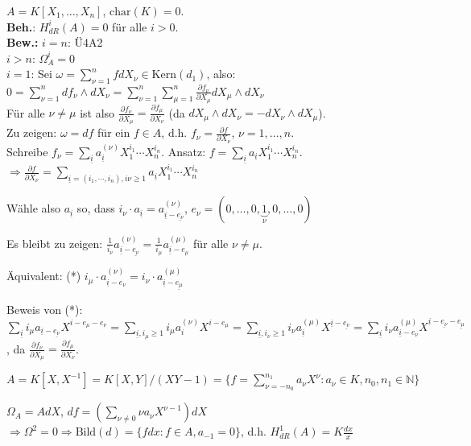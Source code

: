 \begin{nnBsp}
$A=K[X_1, \ldots, X_n]$, $\textrm{char}(K)=0$.\\
\textbf{Beh.}: $H_{dR}^i(A) = 0$ f\"ur alle $i>0$.\\
\textbf{Bew.: } $i=n$: \"U4A2\\
$i>n$: $\Omega_A^i=0$\\
$i=1$: Sei $\omega=\sum_{\nu=1}^nf dX_\nu\in \textrm{Kern}(d_1)$, also:
$0=\sum_{\nu=1}^n df_\nu \wedge dX_\nu=\sum_{\nu=1}^n\sum_{\mu=1}^n\frac{\partial f_\nu}{\partial X_\mu}dX_\mu\wedge dX_\nu$\\
F\"ur alle $\nu\neq \mu$ ist also $\frac{\partial f_\nu}{\partial X_\mu}=\frac{\partial f_\mu}{\partial X_\nu}$ 
(da $dX_\mu\wedge dX_\nu = -dX_\nu\wedge dX_\mu$).\\
Zu zeigen: $\omega = df$ f\"ur ein $f\in A$, d.h. $f_\nu=\frac{\partial f}{\partial X_\nu}$, $\nu=1, \ldots, n$.\\
Schreibe $f_\nu=\sum_{\underline{i}} a_{\underline{i}}^{(\nu)}X_1^{i_1}\cdots X_n^{i_n}$. 
Ansatz: $f=\sum_{\underline{i}} a_{\underline{i}} X_1^{i_1}\cdots X_n^{i_n}$.
$\Rightarrow \frac{\partial f}{\partial X_\nu}
=\sum_{\underline{i}=(i_1, \cdots, i_n), i\nu\geq 1}a_{\underline{i}} X_1^{i_1}\cdots X_n^{i_n}$

W\"ahle also $a_{\underline{i}}$ so, dass $i_\nu\cdot a_{\underline{i}} = a_{\underline{i}-\underline{e_\nu}}^{(\nu)}$, 
$e_\nu=(0,\ldots,0,\underbrace{1}_{\nu},0,\ldots, 0)$

Es bleibt zu zeigen: $\frac{1}{i_\nu} a_{\underline{i}-\underline{e_\nu}}^{(\nu)}
=\frac{1}{i_\mu} a_{\underline{i}-e_\mu}^{(\mu)}$ f\"ur alle $\nu\neq \mu$.

\"Aquivalent: (*) $i_\mu\cdot a_{\underline{i}-e_{\nu}}^{(\nu)}=i_\nu \cdot a_{\underline{i}-\underline{e_\mu}}^{(\mu)}$

Beweis von (*): $
\sum_{\underline{i}} i_\mu a_{\underline{i}-\underline{e_\nu}}X^{i-e_\mu-e_\nu}
= \sum_{\underline{i}, i_\mu\geq 1} i_\mu a_{i}^{(\nu)} X^{i-e_\mu}
= \sum_{\underline{i}, i_\nu\geq 1}i_\nu a_{\underline{i}}^{(\mu)}X^{\underline{i}-\underline{e_\nu}}
= \sum_{\underline{i}} i_\nu a_{\underline{i}-e_\nu}^{(\mu)}X^{\underline{i}-\underline{e_\nu}-\underline{e_\mu}}$, 
da $\frac{\partial f_\nu}{\partial X_\mu} = \frac{\partial f_\mu}{\partial X_\nu}$.
\end{nnBsp}

\begin{nnBsp}
$A=K[X, X^{-1}]=K[X,Y]/(XY-1)=\{f=\sum_{\nu=-n_0}^{n_1} a_\nu X^\nu: a_\nu\in K, n_0, n_1\in \mathbb{N}\}$

$\Omega_A=AdX$, $df=(\sum_{\nu\neq 0}\nu a_\nu X^{\nu-1})dX$
$\Rightarrow \Omega^2 = 0 \Rightarrow \textrm{Bild}(d)=\{fdx:f\in A, a_{-1}=0\}$,
d.h. $H_{dR}^{1}(A) = K\frac{dx}{x}$
\end{nnBsp}
